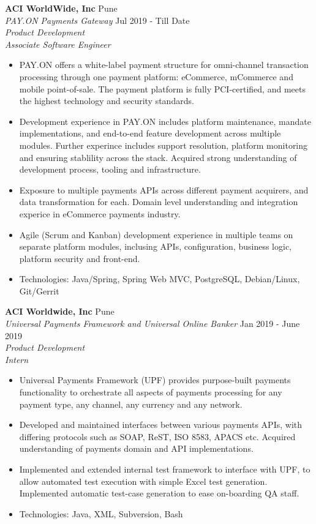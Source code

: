 \documentclass[a4paper]{article}
\begin{document}
\textbf{ACI WorldWide, Inc} \hfill Pune\\
\textit{PAY.ON Payments Gateway} \hfill Jul 2019 - Till Date\\
\textit{Product Development} \\
\textit{Associate Software Engineer}
\vspace{-1mm}
\begin{itemize} \itemsep 1pt
	\item PAY.ON offers a white-label payment structure for omni-channel transaction processing through one payment platform: eCommerce, mCommerce and mobile point-of-sale. The payment platform is fully PCI-certified, and meets the highest technology and security standards.
	\item Development experience in PAY.ON includes platform maintenance, mandate implementations, and end-to-end feature development across multiple modules. Further experince includes support resolution, platform monitoring and ensuring stablility across the stack. Acquired strong understanding of development process, tooling and infrastructure.
    \item Exposure to multiple payments APIs across different payment acquirers, and data transformation for each. Domain level understanding and integration experice in eCommerce payments industry.
    \item Agile (Scrum and Kanban) development experience in multiple teams on separate platform modules, inclusing APIs, configuration, business logic, platform security and front-end.
	\item Technologies: Java/Spring, Spring Web MVC, PostgreSQL, Debian/Linux, Git/Gerrit
\end{itemize}

\textbf{ACI Worldwide, Inc}  \hfill Pune\\
\textit{Universal Payments Framework and Universal Online Banker } \hfill Jan 2019 - June 2019\\
\textit{Product Development} \\
\textit{Intern} \\
\vspace{-1mm}
\begin{itemize} \itemsep 1pt
	\item Universal Payments Framework (UPF) provides purpose-built payments functionality to orchestrate all aspects of payments processing for any payment type, any channel, any currency and any network.
	\item Developed and maintained interfaces between various payments APIs, with differing protocols such as SOAP, ReST, ISO 8583, APACS etc. Acquired understanding of payments domain and API implementations.
	\item Implemented and extended internal test framework to interface with UPF, to allow automated test execution with simple Excel test generation. Implemented automatic test-case generation to ease on-boarding QA staff.
	\item Technologies: Java, XML, Subversion, Bash
\end{itemize}
\end{document}
